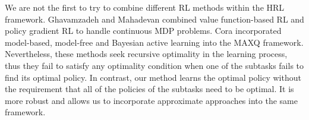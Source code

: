 





We are not the first to try to combine different RL methods within the HRL framework. Ghavamzadeh and Mahadevan \cite{HybridPolicy} combined value function-based RL and policy gradient RL to handle
continuous MDP problems. Cora \cite{Vlad} incorporated model-based, model-free and Bayesian active learning into the MAXQ framework.
Nevertheless, these methods seek recursive optimality in the learning process, 
thus they fail to satisfy any optimality condition when one of the subtasks
fails to find its optimal policy.
In contrast, our method learns the optimal policy without the requirement that 
all of the policies of the subtasks need to be optimal. It is more robust and allows us to incorporate approximate
approaches into the same framework.


